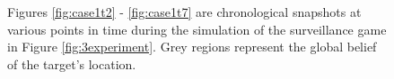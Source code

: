 \begin{figure}
\begin{minipage}{5.0cm}
{		}
		
	\end{minipage}
	
	
	\caption{Figures \ref{fig:case1t2} - \ref{fig:case1t7} are chronological snapshots at various points in time during the simulation of the surveillance game in Figure \ref{fig:3experiment}. Grey regions represent the global belief of the target's location.  
	}\vspace{-0.5cm}
	\label{fig:case1exp}
	
\end{figure}

